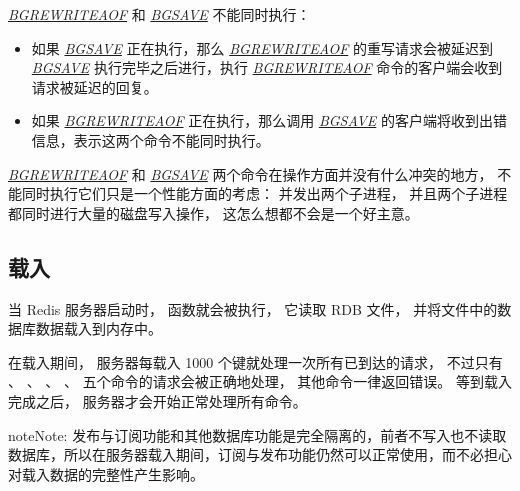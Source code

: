 \documentclass[a4paper,11pt,english]{sphinxmanual}
\begin{document}
\href{http://redis.readthedocs.org/en/latest/server/bgrewriteaof.html\#bgrewriteaof}{\emph{BGREWRITEAOF}} 和 \href{http://redis.readthedocs.org/en/latest/server/bgsave.html\#bgsave}{\emph{BGSAVE}} 不能同时执行：
\begin{itemize}
\item {} 
如果 \href{http://redis.readthedocs.org/en/latest/server/bgsave.html\#bgsave}{\emph{BGSAVE}} 正在执行，那么 \href{http://redis.readthedocs.org/en/latest/server/bgrewriteaof.html\#bgrewriteaof}{\emph{BGREWRITEAOF}} 的重写请求会被延迟到 \href{http://redis.readthedocs.org/en/latest/server/bgsave.html\#bgsave}{\emph{BGSAVE}} 执行完毕之后进行，执行 \href{http://redis.readthedocs.org/en/latest/server/bgrewriteaof.html\#bgrewriteaof}{\emph{BGREWRITEAOF}} 命令的客户端会收到请求被延迟的回复。

\item {} 
如果 \href{http://redis.readthedocs.org/en/latest/server/bgrewriteaof.html\#bgrewriteaof}{\emph{BGREWRITEAOF}} 正在执行，那么调用 \href{http://redis.readthedocs.org/en/latest/server/bgsave.html\#bgsave}{\emph{BGSAVE}} 的客户端将收到出错信息，表示这两个命令不能同时执行。

\end{itemize}

\href{http://redis.readthedocs.org/en/latest/server/bgrewriteaof.html\#bgrewriteaof}{\emph{BGREWRITEAOF}} 和 \href{http://redis.readthedocs.org/en/latest/server/bgsave.html\#bgsave}{\emph{BGSAVE}} 两个命令在操作方面并没有什么冲突的地方，
不能同时执行它们只是一个性能方面的考虑：
并发出两个子进程，
并且两个子进程都同时进行大量的磁盘写入操作，
这怎么想都不会是一个好主意。


\subsection{载入}
\label{internal/rdb:id3}
当 Redis 服务器启动时，
 函数就会被执行，
它读取 RDB 文件，
并将文件中的数据库数据载入到内存中。

在载入期间，
服务器每载入 1000 个键就处理一次所有已到达的请求，
不过只有  、  、  、  、  五个命令的请求会被正确地处理，
其他命令一律返回错误。
等到载入完成之后，
服务器才会开始正常处理所有命令。

\begin{notice}{note}{Note:}
发布与订阅功能和其他数据库功能是完全隔离的，前者不写入也不读取数据库，所以在服务器载入期间，订阅与发布功能仍然可以正常使用，而不必担心对载入数据的完整性产生影响。
\end{notice}
\end{document}
